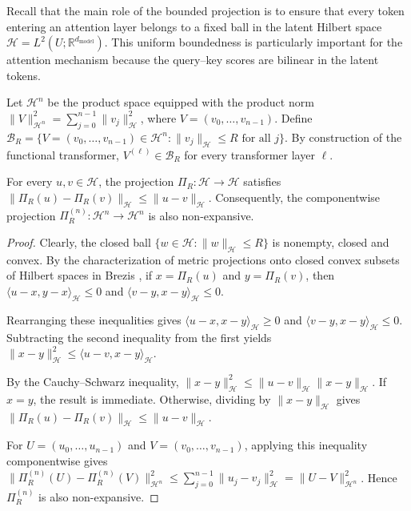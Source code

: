 Recall that the main role of the bounded projection is to ensure that every token entering an attention layer belongs to a fixed ball in the latent Hilbert space \(\mathcal H=L^2(U;\mathbb R^{d_{\mathrm{model}}})\). This uniform boundedness is particularly important for the attention mechanism because the query--key scores are bilinear in the latent tokens.

Let \(\mathcal H^n\) be the product space equipped with the product norm \(\|V\|_{\mathcal H^n}^2=\sum_{j=0}^{n-1}\|v_j\|_{\mathcal H}^2\), where \(V=(v_0,\ldots,v_{n-1})\). Define \(\mathcal B_R=\{V=(v_0,\ldots,v_{n-1})\in\mathcal H^n:\|v_j\|_{\mathcal H}\leqslant R \text{ for all }j\}\). By construction of the functional transformer, \(V^{(\ell)}\in\mathcal B_R\) for every transformer layer \(\ell\).

\begin{lemma}
\label{lem:Non-expansiveness of the bounded projection}
For every \(u,v\in\mathcal H\), the projection \(\Pi_R:\mathcal H\to\mathcal H\) satisfies \(\|\Pi_R(u)-\Pi_R(v)\|_{\mathcal H}\leqslant\|u-v\|_{\mathcal H}\). Consequently, the componentwise projection \(\Pi_R^{(n)}:\mathcal H^n\to\mathcal H^n\) is also non-expansive.
\end{lemma}

\begin{proof}
Clearly, the closed ball \(\{w\in\mathcal H:\|w\|_{\mathcal H}\leqslant R\}\) is nonempty, closed and convex. By the characterization of metric projections onto closed convex subsets of Hilbert spaces in Brezis \cite[Theorem~5.2]{Brezis2011}, if \(x=\Pi_R(u)\) and \(y=\Pi_R(v)\), then \(\langle u-x,y-x\rangle_{\mathcal H}\leqslant0\) and \(\langle v-y,x-y\rangle_{\mathcal H}\leqslant0\).

Rearranging these inequalities gives \(\langle u-x,x-y\rangle_{\mathcal H}\geq0\) and \(\langle v-y,x-y\rangle_{\mathcal H}\leqslant0\). Subtracting the second inequality from the first yields \(\|x-y\|_{\mathcal H}^2\leqslant\langle u-v,x-y\rangle_{\mathcal H}\).

By the Cauchy--Schwarz inequality, \(\|x-y\|_{\mathcal H}^2\leqslant\|u-v\|_{\mathcal H}\|x-y\|_{\mathcal H}\). If \(x=y\), the result is immediate. Otherwise, dividing by \(\|x-y\|_{\mathcal H}\) gives \(\|\Pi_R(u)-\Pi_R(v)\|_{\mathcal H}\leqslant\|u-v\|_{\mathcal H}\).

For \(U=(u_0,\ldots,u_{n-1})\) and \(V=(v_0,\ldots,v_{n-1})\), applying this inequality componentwise gives \(\|\Pi_R^{(n)}(U)-\Pi_R^{(n)}(V)\|_{\mathcal H^n}^2\leqslant\sum_{j=0}^{n-1}\|u_j-v_j\|_{\mathcal H}^2=\|U-V\|_{\mathcal H^n}^2\). Hence \(\Pi_R^{(n)}\) is also non-expansive.
\end{proof}

